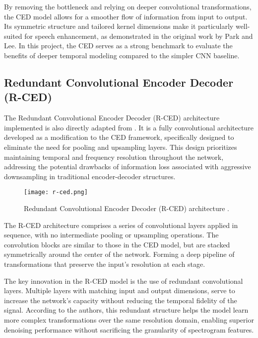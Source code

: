 By removing the bottleneck and relying on deeper convolutional transformations, the CED model allows for a smoother flow of information from input to output. Its symmetric structure and tailored kernel dimensions make it particularly well-suited for speech enhancement, as demonstrated in the original work by Park and Lee. In this project, the CED serves as a strong benchmark to evaluate the benefits of deeper temporal modeling compared to the simpler CNN baseline.

\subsection{Redundant Convolutional Encoder Decoder (R-CED)}

The Redundant Convolutional Encoder Decoder (R-CED) architecture implemented is also directly adapted from \cite{park2017acoustic}. It is a fully convolutional architecture developed as a modification to the CED framework, specifically designed to eliminate the need for pooling and upsampling layers. This design prioritizes maintaining temporal and frequency resolution throughout the network, addressing the potential drawbacks of information loss associated with aggressive downsampling in traditional encoder-decoder structures.

\begin{figure}[h]
    \centering
    \texttt{[image: r-ced.png]}
    \caption{\label{fig:rced}Redundant Convolutional Encoder Decoder (R-CED) architecture \cite{park2017acoustic}.}
\end{figure}

The R-CED architecture comprises a series of convolutional layers applied in sequence, with no intermediate pooling or upsampling operations. The convolution blocks are similar to those in the CED model, but are stacked symmetrically around the center of the network. Forming a deep pipeline of transformations that preserve the input's resolution at each stage.

The key innovation in the R-CED model is the use of redundant convolutional layers. Multiple layers with matching input and output dimensions, serve to increase the network’s capacity without reducing the temporal fidelity of the signal. According to the authors, this redundant structure helps the model learn more complex transformations over the same resolution domain, enabling superior denoising performance without sacrificing the granularity of spectrogram features.

